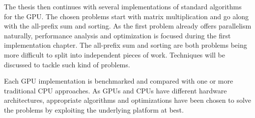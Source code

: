 The thesis then continues with several implementations of standard algorithms for the GPU. The chosen problems start with matrix multiplication and go along with the all-prefix sum and sorting. As the first problem already offers parallelism naturally, performance analysis and optimization is focused during the first implementation chapter. The all-prefix sum and sorting are both problems being more difficult to split into independent pieces of work. Techniques will be discussed to tackle such kind of problems.

Each GPU implementation is benchmarked and compared with one or more traditional CPU approaches. As GPUs and CPUs have different hardware architectures, appropriate algorithms and optimizations have been chosen to solve the problems by exploiting the underlying platform at best.
